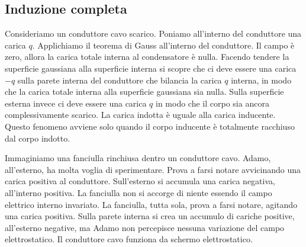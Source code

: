 \subsection{Induzione completa}
Consideriamo un conduttore cavo scarico. Poniamo all'interno del conduttore una carica $q$. Applichiamo il teorema di Gauss all'interno del conduttore. Il campo è zero, allora la carica totale interna al condensatore è nulla. Facendo tendere la superficie gaussiana alla superficie interna si scopre che ci deve essere una carica $-q$ sulla parete interna del conduttore che bilancia la carica $q$ interna, in modo che la carica totale interna alla superficie gaussiana sia nulla. Sulla superficie esterna invece ci deve essere una carica $q$ in modo che il corpo sia ancora complessivamente scarico. La carica indotta è uguale alla carica inducente. Questo fenomeno avviene solo quando il corpo inducente è totalmente racchiuso dal corpo indotto.
\begin{Es}
  Im\-ma\-gi\-nia\-mo una fanciulla rinchiusa dentro un conduttore cavo. Adamo, all'esterno, ha molta voglia di sperimentare. Prova a farsi notare avvicinando una carica positiva al conduttore. Sull'esterno si accumula una carica negativa, all'interno positiva. La fanciulla non si accorge di niente essendo il campo elettrico interno invariato. La fanciulla, tutta sola, prova a farsi notare, agitando una carica positiva. Sulla parete interna si crea un accumulo di cariche positive, all'esterno negative, ma Adamo non percepisce nessuna variazione del campo elettrostatico. Il conduttore cavo funziona da schermo elettrostatico.
\end{Es}
